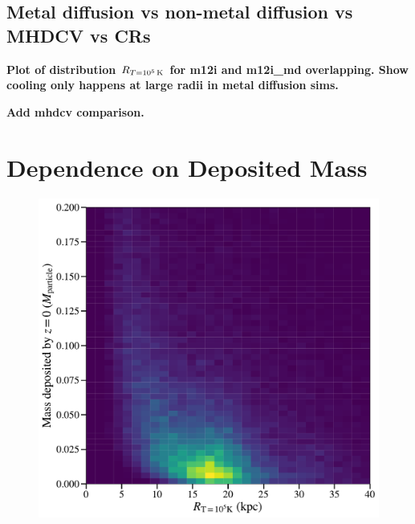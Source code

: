 \documentclass[fleqn,usenatbib]{mnras}
\newcommand{\Rcon}{R_{T=10^5\,{\rm K}}}
\begin{document}
\subsection{Metal diffusion vs non-metal diffusion vs MHDCV vs CRs}

\textbf{Plot of distribution $\Rcon$ for m12i and m12i\_md overlapping. Show cooling only happens at large radii in metal diffusion sims.}

\textbf{Add mhdcv comparison.}

\section{Dependence on Deposited Mass}

\begin{figure}
\includegraphics[width=\columnwidth]{figures/mass_dep_vs_R1e5.pdf}
\label{f: deposited mass vs R1e5}
\end{figure}

\end{document}
